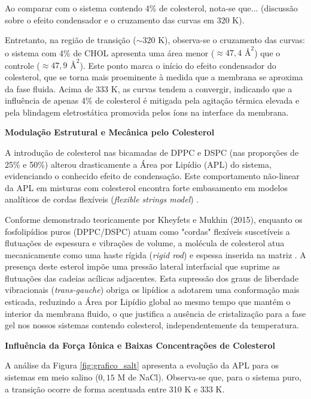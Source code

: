 Ao comparar com o sistema contendo 4\% de colesterol, nota-se que... (discussão sobre o efeito condensador e o cruzamento das curvas em 320 K).

Entretanto, na região de transição ($\sim 320$ K), observa-se o cruzamento das curvas: o sistema com 4\% de CHOL apresenta uma área menor ($\approx 47,4 \text{ \AA}^2$) que o controle ($\approx 47,9 \text{ \AA}^2$). Este ponto marca o início do efeito condensador do colesterol, que se torna mais proeminente à medida que a membrana se aproxima da fase fluida. Acima de 333 K, as curvas tendem a convergir, indicando que a influência de apenas 4\% de colesterol é mitigada pela agitação térmica elevada e pela blindagem eletrostática promovida pelos íons na interface da membrana.

\vspace{1em}
\noindent\textbf{Modulação Estrutural e Mecânica pelo Colesterol }

A introdução de colesterol nas bicamadas de DPPC e DSPC (nas proporções de 25\% e 50\%) alterou drasticamente a Área por Lipídio (APL) do sistema, evidenciando o conhecido efeito de condensação. Este comportamento não-linear da APL em misturas com colesterol encontra forte embasamento em modelos analíticos de cordas flexíveis (\textit{flexible strings model}) \cite{kheyfets2015}.

Conforme demonstrado teoricamente por Kheyfets e Mukhin (2015), enquanto os fosfolipídios puros (DPPC/DSPC) atuam como "cordas" flexíveis suscetíveis a flutuações de espessura e vibrações de volume, a molécula de colesterol atua mecanicamente como uma haste rígida (\textit{rigid rod}) e espessa inserida na matriz \cite{kheyfets2015}. A presença deste esterol impõe uma pressão lateral interfacial que suprime as flutuações das cadeias acílicas adjacentes. Esta supressão dos graus de liberdade vibracionais (\textit{trans-gauche}) obriga os lipídios a adotarem uma conformação mais esticada, reduzindo a Área por Lipídio global ao mesmo tempo que mantém o interior da membrana fluido, o que justifica a ausência de cristalização para a fase gel nos nossos sistemas contendo colesterol, independentemente da temperatura.

\vspace{1em}
\noindent\textbf{Influência da Força Iônica e Baixas Concentrações de Colesterol }

A análise da Figura \ref{fig:grafico_salt} apresenta a evolução da APL para os sistemas em meio salino ($0,15$ M de NaCl). Observa-se que, para o sistema puro, a transição ocorre de forma acentuada entre 310 K e 333 K. 


